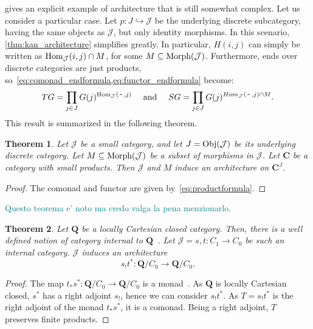 \documentclass[12pt]{article}
\newtheorem{theorem}{Theorem}
\newcommand{\pietro}[1]{\textcolor{teal}{#1}}
\newcommand{\Hom}{{\textnormal{Hom}}}
\newcommand{\Obj}{{\textnormal{Obj}}}
\newcommand{\Morph}{{\textnormal{Morph}}}
\newcommand{\Cat}{{\mathbf{C}}}
\newcommand{\JCat}{{\mathcal{J}}}
\newcommand{\QCat}{{\mathbf{Q}}}
\newcommand{\anon}{{\,\mbox{-}\,}}
\begin{document}
 gives an explicit example of architecture that is still somewhat complex. Let us consider a particular case. Let  $p\colon J \hookrightarrow \JCat$ be the underlying discrete subcategory, having the same objects as $\JCat$, but only identity morphisms. In this scenario, \cref{thm:kan_architecture} simplifies greatly. In particular, $H(i, j)$ can simply be written as $\Hom_\JCat(i, j) \cap M$, for some $M \subseteq \Morph(\JCat)$. Furthermore, ends over discrete categories are just products, so~\cref{eq:comonad_endformula,eq:functor_endformula} become:
\begin{equation}\label{eq:productformula}
    T G = \prod_{j \in J} G(j)^{\Hom_\JCat(\anon, j)}
    \quad\text{ and }\quad
    S G = \prod_{j \in J} G(j)^{Hom_\JCat(\anon, j) \cap M}.
\end{equation}
This result is summarized in the following theorem.

\begin{theorem}\label{thm:discrete_kan_architecture}
    Let $\JCat$ be a small category, and let $J = \Obj(\JCat)$ be its underlying discrete category. Let $M \subseteq \Morph(\JCat)$ be a subset of morphisms in $\JCat$. Let $\Cat$ be a category with small products. Then $\JCat$ and $M$ induce an architecture on $\Cat^J$.
\end{theorem}

\begin{proof}
    The comonad and functor are given by~\cref{eq:productformula}.
\end{proof}


\pietro{Questo teorema e' noto ma credo valga la pena menzionarlo.}

\begin{theorem}\label{thm:categorical_architecture}
    Let $\QCat$ be a locally Cartesian closed category. Then, there is a well defined notion of category {\em internal} to $\QCat$~\cite{mac2013categories}.
    Let $\JCat = s, t \colon C_1 \rightarrow C_0$ be such an internal category. $\JCat$ induces an architecture
    \begin{equation*}
        s_!t^*\colon \QCat/C_0 \rightarrow \QCat/C_0.
    \end{equation*}
\end{theorem}

\begin{proof}
    The map $t_*s^*\colon \QCat/C_0 \rightarrow \QCat/C_0$ is a monad~\cite[Thm.~V.8.2]{Mac_Lane_1994}. As $\QCat$ is locally Cartesian closed, $s^*$ has a right adjoint $s_!$, hence we can consider $s_!t^*$. As $T = s_!t^*$ is the right adjoint of the monad $t_*s^*$, it is a comonad. Being a right adjoint, $T$ preserves finite products.
\end{proof}
\end{document}
